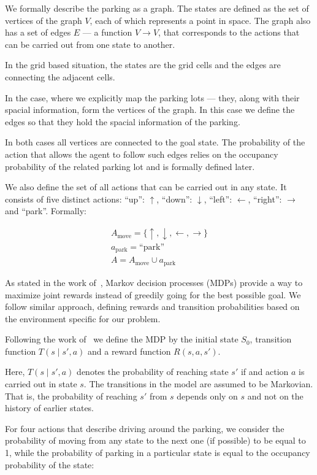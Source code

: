 We formally describe the parking as a graph. The states are defined as the set
of vertices of the graph $V$, each of which represents a point in space. The
graph also has a set of edges $E$ --- a function $V \rightarrow V$, that
corresponds to the actions that can be carried out from one state to another.

In the grid based situation, the states are the grid cells and the edges are
connecting the adjacent cells.

In the case, where we explicitly map the parking lots --- they, along with
their spacial information, form the vertices of the graph. In this case we
define the edges so that they hold the spacial information of the parking.

In both cases all vertices are connected to the goal state. The probability of
the action that allows the agent to follow such edges relies on the occupancy
probability of the related parking lot and is formally defined later.

We also define the set of all actions that can be carried out in any state. It
consists of five distinct actions: ``up'': $\uparrow$, ``down'': $\downarrow$,
``left'': $\leftarrow$, ``right'': $\rightarrow$ and ``park''. Formally:

\begin{eqnarray}
A_{\mbox{move}} = \{ \uparrow, \downarrow, \leftarrow, \rightarrow \} \\
a_{\mbox{park}} = \mbox{``park''} \\
A = A_{\mbox{move}} \cup a_{\mbox{park}}
\end{eqnarray}

As stated in the work of~\citet{tipaldiICRA11}, Markov decision processes
(MDPs) provide a way to maximize joint rewards instead of greedily going for
the best possible goal. We follow similar approach, defining rewards and
transition probabilities based on the environment specific for our problem.

Following the work of~\citet{bellman1957} we define the MDP by the initial
state $S_0$, transition function $T(s \mid s', a)$ and a reward function $R(s,
a, s')$.

Here, $T(s \mid s', a)$ denotes the probability of reaching state
$s'$ if and action $a$ is carried out in state $s$. The transitions in the
model are assumed to be Markovian. That is, the probability of reaching $s'$
from $s$ depends only on $s$ and not on the history of earlier states.

For four actions that describe driving around the parking, we consider the
probability of moving from any state to the next one (if possible) to be equal
to 1, while the probability of parking in a particular state is equal to the
occupancy probability of the state:

